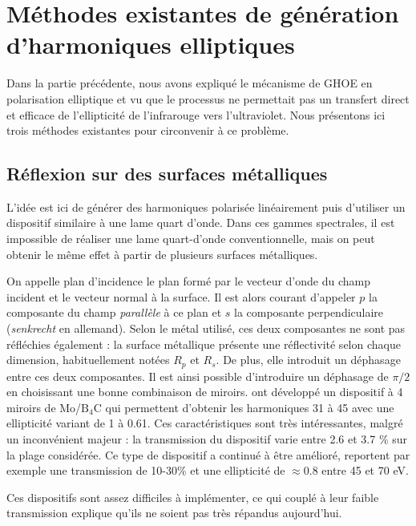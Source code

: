 \section{Méthodes existantes de génération d'harmoniques elliptiques}
Dans la partie précédente, nous avons expliqué le mécanisme de GHOE en polarisation elliptique et vu que le processus ne permettait pas un transfert direct et efficace de l'ellipticité de l'infrarouge vers l'ultraviolet. Nous présentons ici trois méthodes existantes pour circonvenir à ce problème. 

\subsection{Réflexion sur des surfaces métalliques}
\label{sec:metalsurface}
L'idée est ici de générer des harmoniques polarisée linéairement puis d'utiliser un dispositif similaire à une lame quart d'onde. Dans ces gammes spectrales, il est impossible de réaliser une lame quart-d'onde conventionnelle, mais on peut obtenir le même effet à partir de plusieurs surfaces métalliques. \par
On appelle plan d'incidence le plan formé par le vecteur d'onde du champ incident et le vecteur normal à la surface. Il est alors courant d'appeler $p$ la composante du champ \textit{parallèle} à ce plan et $s$ la composante perpendiculaire (\textit{senkrecht} en allemand). Selon le métal utilisé, ces deux composantes ne sont pas réfléchies également : la surface métallique présente une réflectivité selon chaque dimension, habituellement notées $R_p$ et $R_s$. De plus, elle introduit un déphasage entre ces deux composantes. Il est ainsi possible d'introduire un déphasage de $\pi/2$ en choisissant une bonne combinaison de miroirs.  ont développé un dispositif à 4 miroirs de Mo/$\text{B}_\text{4}$C qui permettent d'obtenir les harmoniques 31 à 45 avec une ellipticité variant de 1 à 0.61. Ces caractéristiques sont très intéressantes, malgré un inconvénient majeur : la transmission du dispositif varie entre 2.6 et 3.7 \% sur la plage considérée. Ce type de dispositif a continué à être amélioré,  reportent par exemple une transmission de 10-30\% et une ellipticité de $\approx 0.8$ entre 45 et 70 eV.\par

Ces dispositifs sont assez difficiles à implémenter, ce qui couplé à leur faible transmission explique qu'ils ne soient pas très répandus aujourd'hui. 

